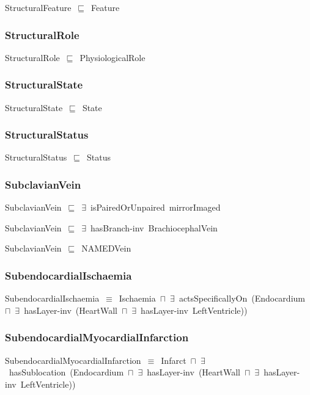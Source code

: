 \documentclass{article}
\begin{document}
StructuralFeature~\ensuremath{\sqsubseteq}~Feature~

\subsubsection*{StructuralRole}

StructuralRole~\ensuremath{\sqsubseteq}~PhysiologicalRole~

\subsubsection*{StructuralState}

StructuralState~\ensuremath{\sqsubseteq}~State~

\subsubsection*{StructuralStatus}

StructuralStatus~\ensuremath{\sqsubseteq}~Status~

\subsubsection*{SubclavianVein}

SubclavianVein~\ensuremath{\sqsubseteq}~\ensuremath{\exists}~isPairedOrUnpaired~mirrorImaged~

SubclavianVein~\ensuremath{\sqsubseteq}~\ensuremath{\exists}~hasBranch-inv~BrachiocephalVein~

SubclavianVein~\ensuremath{\sqsubseteq}~NAMEDVein~

\subsubsection*{SubendocardialIschaemia}

SubendocardialIschaemia~\ensuremath{\equiv}~Ischaemia~\ensuremath{\sqcap}~\ensuremath{\exists}~actsSpecificallyOn~(Endocardium~\ensuremath{\sqcap}~\ensuremath{\exists}~hasLayer-inv~(HeartWall~\ensuremath{\sqcap}~\ensuremath{\exists}~hasLayer-inv~LeftVentricle))

\subsubsection*{SubendocardialMyocardialInfarction}

SubendocardialMyocardialInfarction~\ensuremath{\equiv}~Infarct~\ensuremath{\sqcap}~\ensuremath{\exists}~hasSublocation~(Endocardium~\ensuremath{\sqcap}~\ensuremath{\exists}~hasLayer-inv~(HeartWall~\ensuremath{\sqcap}~\ensuremath{\exists}~hasLayer-inv~LeftVentricle))
\end{document}
